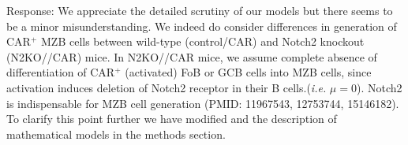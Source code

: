 \documentclass[11pt]{article}
\newcommand{\red}[1]{{\color{red}{#1}}}
\newcommand{\blue}[1]{{\color{blue}{#1}}}
\begin{document}
Response: We appreciate the detailed scrutiny of our models but there seems to be a minor misunderstanding.
We indeed do consider differences in generation of CAR$^{+}$ MZB cells between wild-type (control/CAR) and Notch2 knockout (N2KO//CAR) mice.
In N2KO//CAR mice, we assume complete absence of differentiation of CAR$^{+}$ (activated) FoB  or GCB cells into MZB cells, since activation induces deletion of Notch2 receptor in their B cells.(\textit{i.e.} $\mu=0$).
Notch2 is indispensable for MZB cell generation (PMID: 11967543, 12753744, 15146182).
To clarify this point further we have modified \red{Fig. 7 (panels C and D)} and the description of mathematical models in the methods section.

\blue{Depending on the tone that you are going for you may either keep or remove this: \\
We believe we are known in the field for taking great care in developing approaches that integrate theory and biology closely; and would like to argue that our model-design here too is well tethered to the underlying biology of the experimental system and suited for the questions we are asking. 
}
\end{document}
